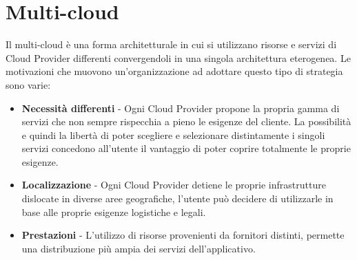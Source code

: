 
\section{Multi-cloud}
Il multi-cloud è una forma architetturale in cui si utilizzano risorse e servizi di Cloud Provider differenti convergendoli in una singola architettura eterogenea. 
Le motivazioni che muovono un'organizzazione ad adottare questo tipo di strategia sono varie:
\begin{itemize}
\item \textbf{Necessità differenti} - Ogni Cloud Provider propone la propria gamma di servizi che non sempre rispecchia a pieno le esigenze del cliente. La possibilità e quindi la libertà di poter scegliere e selezionare distintamente i singoli servizi concedono all'utente il vantaggio di poter coprire totalmente le proprie esigenze.
\item \textbf{Localizzazione} - Ogni Cloud Provider detiene le proprie infrastrutture dislocate in diverse aree geografiche, l'utente può decidere di utilizzarle in base alle proprie esigenze logistiche e legali.
\item \textbf{Prestazioni} - L'utilizzo di risorse provenienti da fornitori distinti, permette una distribuzione più ampia dei servizi dell'applicativo.
\end{itemize}